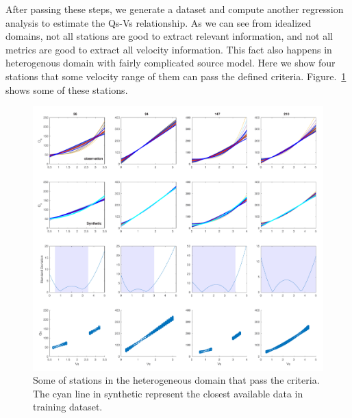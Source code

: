 After passing these steps, we generate a dataset and compute another regression analysis to estimate the Qs-Vs relationship. As we can see from idealized domains, not all stations are good to extract relevant information, and not all metrics are good to extract all velocity information. This fact also happens in heterogenous domain with fairly complicated source model. Here we show four stations that some velocity range of them can pass the defined criteria. Figure.~\ref{fig:used_stations_example} shows some of these stations. 

  \begin{figure}[ht]
    \centering
    \includegraphics[width=\textwidth]{figures/pdf/used_stations_example.pdf}
    \caption{Some of stations in the heterogeneous domain that pass the criteria. The cyan line in synthetic represent the closest available data in training dataset.}
    \label{fig:used_stations_example}
\end{figure}

